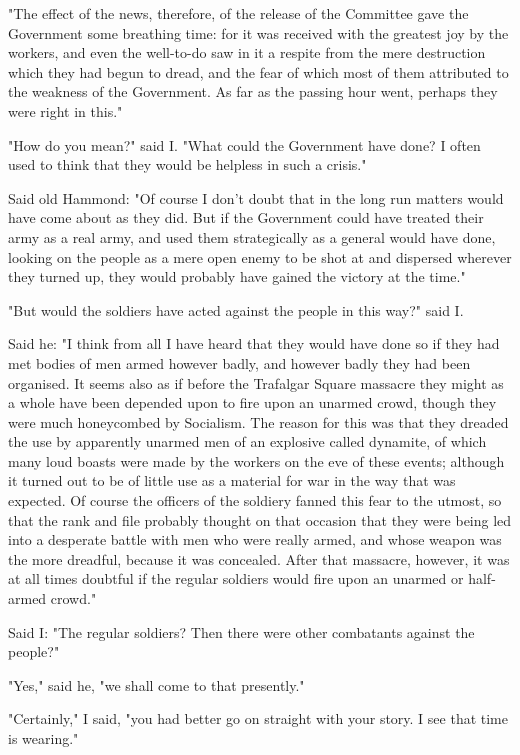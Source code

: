"The effect of the news, therefore, of the release of the Committee gave
the Government some breathing time: for it was received with the
greatest joy by the workers, and even the well-to-do saw in it a respite
from the mere destruction which they had begun to dread, and the fear of
which most of them attributed to the weakness of the Government. As far
as the passing hour went, perhaps they were right in this."

"How do you mean?" said I. "What could the Government have done? I often
used to think that they would be helpless in such a crisis."

Said old Hammond: "Of course I don't doubt that in the long run matters
would have come about as they did. But if the Government could have
treated their army as a real army, and used them strategically as a
general would have done, looking on the people as a mere open enemy to
be shot at and dispersed wherever they turned up, they would probably
have gained the victory at the time."

"But would the soldiers have acted against the people in this way?" said
I.

Said he: "I think from all I have heard that they would have done so if
they had met bodies of men armed however badly, and however badly they
had been organised. It seems also as if before the Trafalgar Square
massacre they might as a whole have been depended upon to fire upon an
unarmed crowd, though they were much honeycombed by Socialism. The
reason for this was that they dreaded the use by apparently unarmed men
of an explosive called dynamite, of which many loud boasts were made by
the workers on the eve of these events; although it turned out to be of
little use as a material for war in the way that was expected. Of course
the officers of the soldiery fanned this fear to the utmost, so that the
rank and file probably thought on that occasion that they were being led
into a desperate battle with men who were really armed, and whose weapon
was the more dreadful, because it was concealed. After that massacre,
however, it was at all times doubtful if the regular soldiers would fire
upon an unarmed or half-armed crowd."

Said I: "The regular soldiers? Then there were other combatants against
the people?"

"Yes," said he, "we shall come to that presently."

"Certainly," I said, "you had better go on straight with your story. I
see that time is wearing."

